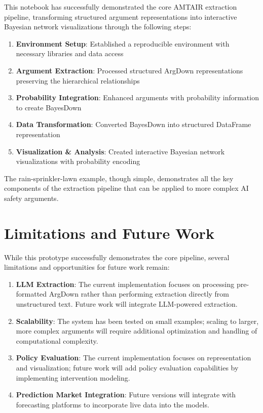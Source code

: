 \documentclass[
  11pt,
  letterpaper,
]{book}
\providecommand{\tightlist}{%
  \setlength{\itemsep}{0pt}\setlength{\parskip}{0pt}}
\begin{document}
This notebook has successfully demonstrated the core AMTAIR extraction
pipeline, transforming structured argument representations into
interactive Bayesian network visualizations through the following steps:

\begin{enumerate}
\def\labelenumi{\arabic{enumi}.}
\tightlist
\item
  \textbf{Environment Setup}: Established a reproducible environment
  with necessary libraries and data access
\item
  \textbf{Argument Extraction}: Processed structured ArgDown
  representations preserving the hierarchical relationships
\item
  \textbf{Probability Integration}: Enhanced arguments with probability
  information to create BayesDown
\item
  \textbf{Data Transformation}: Converted BayesDown into structured
  DataFrame representation
\item
  \textbf{Visualization \& Analysis}: Created interactive Bayesian
  network visualizations with probability encoding
\end{enumerate}

The rain-sprinkler-lawn example, though simple, demonstrates all the key
components of the extraction pipeline that can be applied to more
complex AI safety arguments.

\section{Limitations and Future Work}\label{limitations-and-future-work}

While this prototype successfully demonstrates the core pipeline,
several limitations and opportunities for future work remain:

\begin{enumerate}
\def\labelenumi{\arabic{enumi}.}
\item
  \textbf{LLM Extraction}: The current implementation focuses on
  processing pre-formatted ArgDown rather than performing extraction
  directly from unstructured text. Future work will integrate
  LLM-powered extraction.
\item
  \textbf{Scalability}: The system has been tested on small examples;
  scaling to larger, more complex arguments will require additional
  optimization and handling of computational complexity.
\item
  \textbf{Policy Evaluation}: The current implementation focuses on
  representation and visualization; future work will add policy
  evaluation capabilities by implementing intervention modeling.
\item
  \textbf{Prediction Market Integration}: Future versions will integrate
  with forecasting platforms to incorporate live data into the models.
\end{enumerate}
\end{document}

